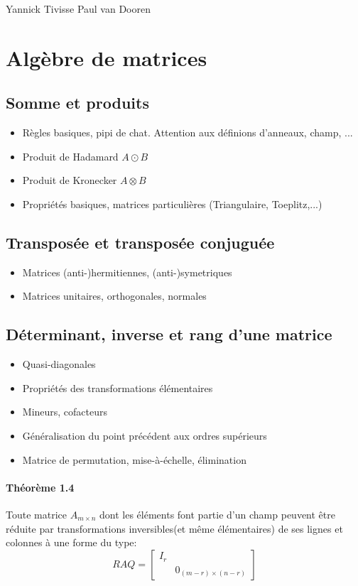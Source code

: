 

{Yannick Tivisse}
{Paul van Dooren}

\section{Algèbre de matrices}
\subsection{Somme et produits}
\begin{itemize}
\item Règles basiques, pipi de chat. Attention aux définions d'anneaux, champ, ...
\item Produit de Hadamard $A\odot B$
\item Produit de Kronecker $A\otimes B$
\item Propriétés basiques, matrices particulières (Triangulaire, Toeplitz,...)
\end{itemize}
\subsection{Transposée et transposée conjuguée}
\begin{itemize}
\item Matrices (anti-)hermitiennes, (anti-)symetriques
\item Matrices unitaires, orthogonales, normales
\end{itemize}
\subsection{Déterminant, inverse et rang d'une matrice}
\begin{itemize}
\item Quasi-diagonales
\item Propriétés des transformations élémentaires
\item Mineurs, cofacteurs
\item Généralisation du point précédent aux ordres supérieurs
\item Matrice de permutation, mise-à-échelle, élimination\\
\end{itemize}

\paragraph{Théorème 1.4}
Toute matrice $A_{m\times n}$ dont les éléments font partie d'un champ peuvent être réduite par transformations inversibles(et même élémentaires) de ses lignes et colonnes à une forme du type:
$$RAQ = \begin{bmatrix}
I_r &  \\
 & 0_{(m-r)\times (n-r)}
\end{bmatrix} $$

